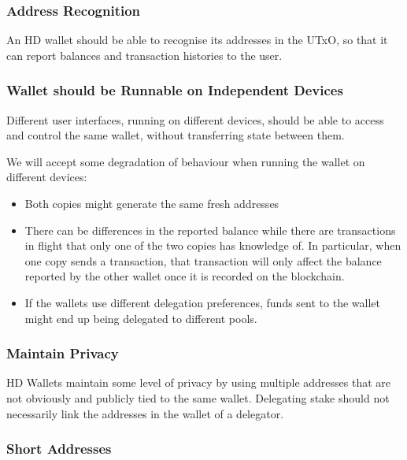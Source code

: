 \documentclass[11pt,a4paper]{article}
\begin{document}
\subsubsection{Address Recognition}\label{address-recognition}

An HD wallet should be able to recognise its addresses in the UTxO, so
that it can report balances and transaction histories to the user.

\subsubsection{Wallet should be Runnable on Independent
Devices}\label{wallet-should-be-runnable-on-independent-devices}

Different user interfaces, running on different devices, should be able
to access and control the same wallet, without transferring state
between them.

We will accept some degradation of behaviour when running the wallet on
different devices:

\begin{itemize}
\item
  Both copies might generate the same fresh addresses
\item
  There can be differences in the reported balance while there are
  transactions in flight that only one of the two copies has knowledge
  of. In particular, when one copy sends a transaction, that transaction
  will only affect the balance reported by the other wallet once it is
  recorded on the blockchain.
\item
  If the wallets use different delegation preferences, funds sent to the
  wallet might end up being delegated to different pools.
\end{itemize}

\subsubsection{Maintain Privacy}\label{maintain-privacy}

HD Wallets maintain some level of privacy by using multiple addresses
that are not obviously and publicly tied to the same wallet. Delegating
stake should not necessarily link the addresses in the wallet of a
delegator.

\subsubsection{Short Addresses}\label{short-addresses}
\end{document}
